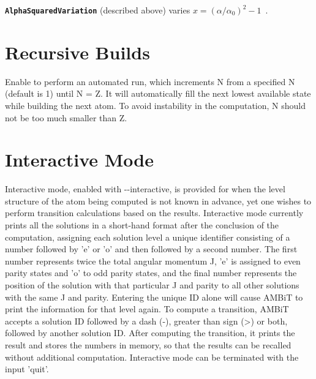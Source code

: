 \documentclass[a4paper,11pt]{article}
\newcommand{\option}[1]{\smallskip\noindent\textbf{\texttt{#1}}}
\begin{document}
\option{AlphaSquaredVariation} (described above) varies $x = (\alpha/\alpha_0)^2-1$~\cite{dzuba99pra}.

\section{Recursive Builds}

Enable to perform an automated run, which increments N from a specified N (default is 1) until N = Z. It will automatically fill the next lowest available state while building the next atom. To avoid instability in the computation, N should not be too much smaller than Z.

\section{Interactive Mode}

Interactive mode, enabled with -{}-interactive, is provided for when the level structure of the atom being computed is not known in advance, yet one wishes to perform transition calculations based on the results. Interactive mode currently prints all the solutions in a short-hand format after the conclusion of the computation, assigning each solution level a unique identifier consisting of a number followed by 'e' or 'o' and then followed by a second number. The first number represents twice the total angular momentum J, 'e' is assigned to even parity states and 'o' to odd parity states, and the final number represents the position of the solution with that particular J and parity to all other solutions with the same J and parity. Entering the unique ID alone will cause AMBiT to print the information for that level again. To compute a transition, AMBiT accepts a solution ID followed by a dash (-), greater than sign (>) or both, followed by another solution ID. After computing the transition, it prints the result and stores the numbers in memory, so that the results can be recalled without additional computation. Interactive mode can be terminated with the input 'quit'.



\end{document}
